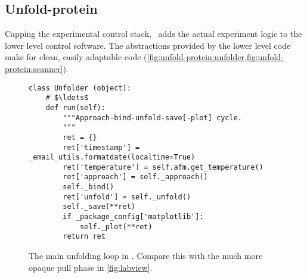 \subsection{Unfold-protein}
\label{sec:pyafm:unfold-protein}

Capping the experimental control stack, \unfoldprotein\ adds the
actual experiment logic to the lower level control software.  The
abstractions provided by the lower level code make for clean, easily
adaptable code
(\cref{fig:unfold-protein:unfolder,fig:unfold-protein:scanner}).

\begin{figure}
  \begin{center}
\begin{verbatim}
class Unfolder (object):
    # $\ldots$
    def run(self):
        """Approach-bind-unfold-save[-plot] cycle.
        """
        ret = {}
        ret['timestamp'] = _email_utils.formatdate(localtime=True)
        ret['temperature'] = self.afm.get_temperature()
        ret['approach'] = self._approach()
        self._bind()
        ret['unfold'] = self._unfold()
        self._save(**ret)
        if _package_config['matplotlib']:
            self._plot(**ret)
        return ret
\end{verbatim}
    \caption{The main unfolding loop in \unfoldprotein.  Compare this
      with the much more opaque pull phase in
      \cref{fig:labview}.\label{fig:unfold-protein:unfolder}}
  \end{center}
\end{figure}

